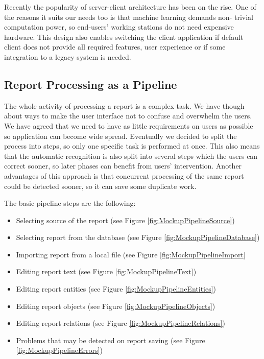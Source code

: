 


Recently the popularity of server-client architecture has been on the rise. One
of the reasons it suits our needs too is that machine learning demands non-
trivial computation power, so end-users' working stations do not need expensive
hardware. This design also enables switching the client application if default
\textan{} client does not provide all required features, user experience or if
some integration to a legacy system is needed.

\subsection{Report Processing as a Pipeline}
\label{ssec:ReportPipeline}

The whole activity of processing a report is a complex task. We have though
about ways to make the user interface not to confuse and overwhelm the users.
We have agreed that we need to have as little requirements on users as possible
so application can become wide spread. Eventually we decided to split the
process into steps, so only one specific task is performed at once. This also
means that the automatic recognition is also split into several steps which the
users can correct sooner, so later phases can benefit from users' intervention.
Another advantages of this approach is that concurrent processing of the same
report could be detected sooner, so it can save some duplicate work.

The basic pipeline steps are the following:
\begin{itemize}
	\item Selecting source of the report (see Figure \ref{fig:MockupPipelineSource})
	\item Selecting report from the database (see Figure \ref{fig:MockupPipelineDatabase})
	\item Importing report from a local file (see Figure \ref{fig:MockupPipelineImport}
	\item Editing report text (see Figure \ref{fig:MockupPipelineText})
	\item Editing report entities (see Figure \ref{fig:MockupPipelineEntities})
	\item Editing report objects (see Figure \ref{fig:MockupPipelineObjects})
	\item Editing report relations (see Figure \ref{fig:MockupPipelineRelations})
	\item Problems that may be detected on report saving (see Figure \ref{fig:MockupPipelineErrors})
\end{itemize}

